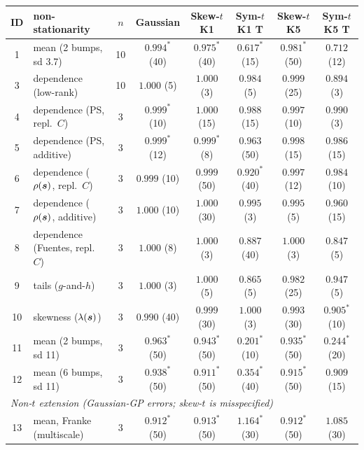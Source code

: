 \setlength{\tabcolsep}{3.7pt}
\begin{tabular}{clcccccc}
\toprule
ID & non-stationarity & $n$ & Gaussian & Skew-$t$ K1 & Sym-$t$ K1 T & Skew-$t$ K5 & Sym-$t$ K5 T \\
\midrule
1 & mean (2 bumps, sd 3.7) & 10 & $0.994^{*}$ {\tiny(40)} & $0.975^{*}$ {\tiny(40)} & $\mathbf{0.617^{*}}$ {\tiny(15)} & $0.981^{*}$ {\tiny(50)} & $\mathbf{0.712}$ {\tiny(12)} \\
3 & dependence (low-rank) & 10 & $1.000$ {\tiny(5)} & $1.000$ {\tiny(3)} & $0.984$ {\tiny(5)} & $0.999$ {\tiny(25)} & $0.894$ {\tiny(3)} \\
4 & dependence (PS, repl.\ $C$) & 3 & $0.999^{*}$ {\tiny(10)} & $1.000$ {\tiny(15)} & $0.988$ {\tiny(15)} & $0.997$ {\tiny(10)} & $0.990$ {\tiny(3)} \\
5 & dependence (PS, additive) & 3 & $0.999^{*}$ {\tiny(12)} & $0.999^{*}$ {\tiny(8)} & $0.963$ {\tiny(50)} & $0.998$ {\tiny(15)} & $0.986$ {\tiny(15)} \\
6 & dependence ($\rho(\boldsymbol{s})$, repl.\ $C$) & 3 & $0.999$ {\tiny(10)} & $0.999$ {\tiny(50)} & $0.920^{*}$ {\tiny(40)} & $0.997$ {\tiny(12)} & $0.984$ {\tiny(10)} \\
7 & dependence ($\rho(\boldsymbol{s})$, additive) & 3 & $1.000$ {\tiny(10)} & $1.000$ {\tiny(30)} & $0.995$ {\tiny(3)} & $0.995$ {\tiny(5)} & $0.960$ {\tiny(15)} \\
8 & dependence (Fuentes, repl.\ $C$) & 3 & $1.000$ {\tiny(8)} & $1.000$ {\tiny(3)} & $0.887$ {\tiny(40)} & $1.000$ {\tiny(3)} & $0.847$ {\tiny(5)} \\
9 & tails ($g$-and-$h$) & 3 & $1.000$ {\tiny(3)} & $1.000$ {\tiny(5)} & $0.865$ {\tiny(5)} & $0.982$ {\tiny(25)} & $0.947$ {\tiny(5)} \\
10 & skewness ($\lambda(\boldsymbol{s})$) & 3 & $0.990$ {\tiny(40)} & $0.999$ {\tiny(30)} & $1.000$ {\tiny(3)} & $0.993$ {\tiny(30)} & $0.905^{*}$ {\tiny(10)} \\
11 & mean (2 bumps, sd 11) & 3 & $0.963^{*}$ {\tiny(50)} & $0.943^{*}$ {\tiny(50)} & $\mathbf{0.201^{*}}$ {\tiny(10)} & $0.935^{*}$ {\tiny(50)} & $\mathbf{0.244^{*}}$ {\tiny(20)} \\
12 & mean (6 bumps, sd 11) & 3 & $0.938^{*}$ {\tiny(50)} & $0.911^{*}$ {\tiny(50)} & $\mathbf{0.354^{*}}$ {\tiny(40)} & $0.915^{*}$ {\tiny(50)} & $0.909$ {\tiny(15)} \\
\midrule
\multicolumn{8}{l}{\emph{Non-$t$ extension (Gaussian-GP errors; skew-$t$ is misspecified)}} \\
13 & mean, Franke (multiscale) & 3 & $0.912^{*}$ {\tiny(50)} & $0.913^{*}$ {\tiny(50)} & $1.164^{*}$ {\tiny(30)} & $0.912^{*}$ {\tiny(50)} & $1.085$ {\tiny(30)} \\

\end{tabular}
